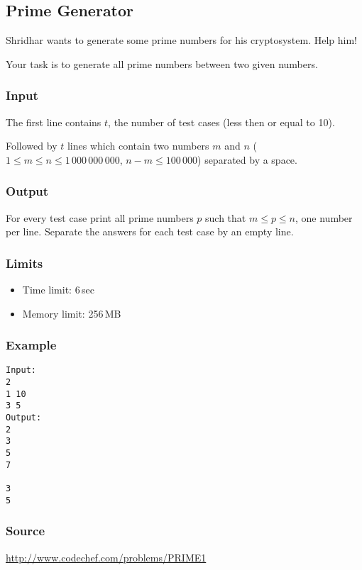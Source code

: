 \subsection{Prime Generator}


Shridhar wants to generate some prime numbers for his cryptosystem. Help him!

Your task is to generate all prime numbers between two given numbers.

\subsubsection*{Input}

The first line contains $t$, the number of test cases (less then or equal to 10).

Followed by $t$ lines which contain two numbers $m$ and $n$
($1 \leq m \leq n \leq 1\,000\,000\,000$, $n-m \leq 100\,000$) separated by a space.

\subsubsection*{Output}

For every test case print all prime numbers $p$ such that $m \leq p \leq n$,
one number per line. Separate the answers for each test case by an empty line.

\subsubsection*{Limits}
\begin{itemize}
    \item Time limit: 6\,sec
    \item Memory limit: 256\,MB
\end{itemize}

\subsubsection*{Example}
\begin{verbatim}
Input:
2
1 10
3 5
Output:
2
3
5
7

3
5
\end{verbatim}

\subsubsection*{Source} \url{http://www.codechef.com/problems/PRIME1}
